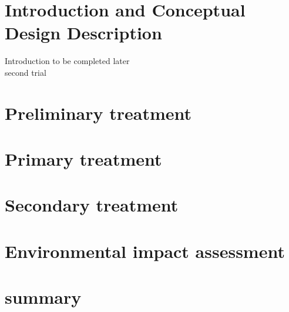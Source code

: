 \documentclass[12pt]{article}
\begin{document}
\section{Introduction and Conceptual Design Description}
Introduction to be completed later\\
second trial
\newpage

\section{Preliminary treatment}
\newpage

\section{Primary treatment}
\newpage

\section{Secondary treatment}
\newpage

\section{Environmental impact assessment}
\newpage

\section{summary}
\newpage
\end{document}
